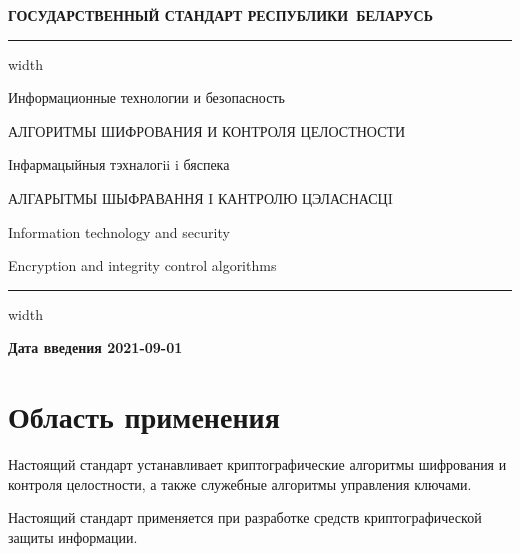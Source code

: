 \newpage
\setcounter{page}{1}
\pagestyle{headings}

\begin{center}
{\bfseries
ГОСУДАРСТВЕННЫЙ СТАНДАРТ РЕСПУБЛИКИ~БЕЛАРУСЬ
\vskip 2pt
\hrule width\textwidth

\vskip 9pt

Информационные технологии и безопасность

АЛГОРИТМЫ ШИФРОВАНИЯ И КОНТРОЛЯ ЦЕЛОСТНОСТИ

\vskip 9pt

Iнфармацыйныя тэхналогii i бяспека

АЛГАРЫТМЫ ШЫФРАВАННЯ I КАНТРОЛЮ ЦЭЛАСНАСЦI
} %

\vskip 9pt

Information technology and security

Encryption and integrity control algorithms

\vskip 4pt                
\hrule width \textwidth
\end{center}

\mbox{}\hfill{\bfseries Дата введения 2021-09-01}

\chapter{Область применения}

Настоящий стандарт устанавливает криптографические алгоритмы шифрования и 
контроля целостности, а также служебные алгоритмы управления ключами.

Настоящий стандарт применяется при разработке средств криптографической 
защиты информации. 

